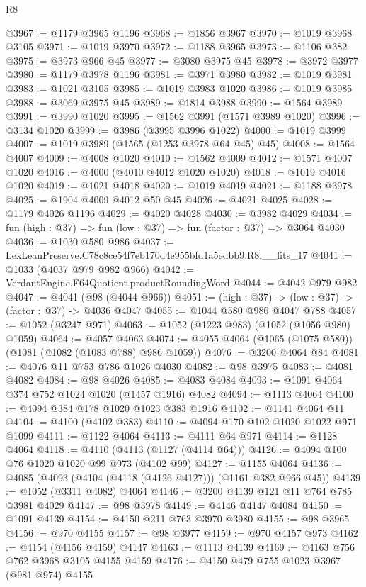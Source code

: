 \begin{lexlean}{R8}
\begin{coremodule}
@3967 := @1179 @3965 @1196
@3968 := @1856 @3967
@3970 := @1019 @3968 @3105
@3971 := @1019 @3970
@3972 := @1188 @3965
@3973 := @1106 @382
@3975 := @3973 @966 @45
@3977 := @3080 @3975 @45
@3978 := @3972 @3977
@3980 := @1179 @3978 @1196
@3981 := @3971 @3980
@3982 := @1019 @3981
@3983 := @1021 @3105
@3985 := @1019 @3983 @1020
@3986 := @1019 @3985
@3988 := @3069 @3975 @45
@3989 := @1814 @3988
@3990 := @1564 @3989
@3991 := @3990 @1020
@3995 := @1562 @3991 (@1571 @3989 @1020)
@3996 := @3134 @1020
@3999 := @3986 (@3995 @3996 @1022)
@4000 := @1019 @3999
@4007 := @1019 @3989 (@1565 (@1253 @3978 @64 @45) @45)
@4008 := @1564 @4007
@4009 := @4008 @1020
@4010 := @1562 @4009
@4012 := @1571 @4007 @1020
@4016 := @4000 (@4010 @4012 @1020 @1020)
@4018 := @1019 @4016 @1020
@4019 := @1021 @4018
@4020 := @1019 @4019
@4021 := @1188 @3978
@4025 := @1904 @4009 @4012 @50 @45
@4026 := @4021 @4025
@4028 := @1179 @4026 @1196
@4029 := @4020 @4028
@4030 := @3982 @4029
@4034 := fun (high : @37) => fun (low : @37) => fun (factor : @37) => @3064 @4030
@4036 := @1030 @580 @986
@4037 := LexLeanPreserve.C78c8ce54f7eb170d4e955bfd1a5edbb9.R8.__fits_17
@4041 := @1033 (@4037 @979 @982 @966)
@4042 := VerdantEngine.F64Quotient.productRoundingWord
@4044 := @4042 @979 @982
@4047 := @4041 (@98 (@4044 @966))
@4051 := (high : @37) -> (low : @37) -> (factor : @37) -> @4036 @4047
@4055 := @1044 @580 @986 @4047 @788
@4057 := @1052 (@3247 @971)
@4063 := @1052 (@1223 @983) (@1052 (@1056 @980) @1059)
@4064 := @4057 @4063
@4074 := @4055 @4064 (@1065 (@1075 @580)) (@1081 (@1082 (@1083 @788) @986 @1059))
@4076 := @3200 @4064 @84
@4081 := @4076 @11 @753 @786 @1026 @4030
@4082 := @98 @3975
@4083 := @4081 @4082
@4084 := @98 @4026
@4085 := @4083 @4084
@4093 := @1091 @4064 @374 @752 @1024 @1020 (@1457 @1916) @4082
@4094 := @1113 @4064
@4100 := @4094 @384 @178 @1020 @1023 @383 @1916
@4102 := @1141 @4064 @11
@4104 := @4100 (@4102 @383)
@4110 := @4094 @170 @102 @1020 @1022 @971 @1099
@4111 := @1122 @4064
@4113 := @4111 @64 @971
@4114 := @1128 @4064
@4118 := @4110 (@4113 (@1127 (@4114 @64)))
@4126 := @4094 @100 @76 @1020 @1020 @99 @973 (@4102 @99)
@4127 := @1155 @4064
@4136 := @4085 (@4093 (@4104 (@4118 (@4126 @4127))) (@1161 @382 @966 @45))
@4139 := @1052 (@3311 @4082) @4064
@4146 := @3200 @4139 @121 @11 @764 @785 @3981 @4029
@4147 := @98 @3978
@4149 := @4146 @4147 @4084
@4150 := @1091 @4139
@4154 := @4150 @211 @763 @3970 @3980
@4155 := @98 @3965
@4156 := @970 @4155
@4157 := @98 @3977
@4159 := @970 @4157 @973
@4162 := @4154 (@4156 @4159) @4147
@4163 := @1113 @4139
@4169 := @4163 @756 @762 @3968 @3105 @4155 @4159
@4176 := @4150 @479 @755 @1023 @3967 (@981 @974) @4155

\end{coremodule}
\end{lexlean}
